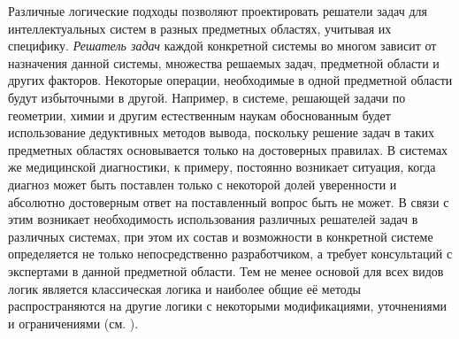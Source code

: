 Различные логические подходы позволяют проектировать решатели задач для интеллектуальных систем в разных предметных областях, учитывая их специфику. \textit{Решатель задач} каждой конкретной системы во многом зависит от назначения данной системы, множества решаемых задач, предметной области и других факторов. Некоторые операции, необходимые в одной предметной области будут избыточными в другой. Например, в системе, решающей задачи по геометрии, химии и другим естественным наукам обоснованным будет использование дедуктивных методов вывода, поскольку решение задач в таких предметных областях основывается только на достоверных правилах. В системах же медицинской диагностики, к примеру, постоянно возникает ситуация, когда диагноз может быть поставлен только с некоторой долей уверенности и абсолютно достоверным ответ на поставленный вопрос быть не может. В связи с этим возникает необходимость использования различных решателей задач в различных системах, при этом их состав и возможности в конкретной системе определяется не только непосредственно разработчиком, а требует консультаций с экспертами в данной предметной области. Тем не менее основой для всех видов логик является классическая логика и наиболее общие её методы распространяются на другие логики с некоторыми модификациями, уточнениями и ограничениями (см. ).

